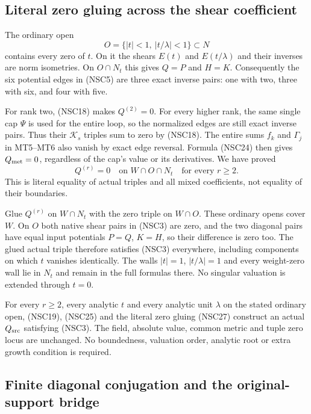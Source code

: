 \subsection{Literal zero gluing across the shear coefficient}

The ordinary open
\[
                 O=\{|t|<1,\ |t/\lambda|<1\}\subset N
 \tag{NSC26}
\]
contains every zero of $t$.  On it the shears $E(t)$
and $E(t/\lambda)$ and their inverses are norm
isometries.  On $O\cap N_t$ this gives
$Q=P$ and $H=K$.  Consequently the six potential
edges in (NSC5) are three exact inverse pairs:
one with two, three with six, and four with five.

For rank two, (NSC18) makes $Q^{(2)}=0$.
For every higher rank, the same single cap $\Psi$
is used for the entire loop, so the normalized edges
are still exact inverse pairs.  Thus their
$\mathcal K_s$ triples sum to zero by (NSC18).
The entire sums $f_k$ and $\Gamma_j$ in MT5--MT6
also vanish by exact edge reversal.  Formula (NSC24)
then gives $Q_{\rm met}=0$, regardless of the cap's
value or its derivatives.  We have proved
\[
                    Q^{(r)}=0
                         \quad\text{on }W\cap O\cap N_t
                                  \quad\text{for every }r\geq2.
 \tag{NSC27}
\]
This is literal equality of actual triples and all
mixed coefficients, not equality of their boundaries.

Glue $Q^{(r)}$ on $W\cap N_t$ with the zero triple
on $W\cap O$.  These ordinary opens cover $W$.
On $O$ both native shear pairs in (NSC3) are zero,
and the two diagonal pairs have equal input potentials
$P=Q$, $K=H$, so their difference is zero too.
The glued actual triple therefore satisfies (NSC3)
everywhere, including components on which $t$ vanishes
identically.  The walls $|t|=1$, $|t/\lambda|=1$ and
every weight-zero wall lie in $N_t$ and remain in
the full formulas there.  No singular valuation
is extended through $t=0$.

\begin{theorem}
For every $r\geq2$, every analytic $t$ and every
analytic unit $\lambda$ on the stated ordinary open,
(NSC19), (NSC25) and the literal zero gluing (NSC27)
construct an actual $Q_{\rm src}$ satisfying (NSC3).
The field, absolute value, common metric and tuple
zero locus are unchanged.  No boundedness, valuation
order, analytic root or extra growth condition is required.
\end{theorem}

\subsection{Finite diagonal conjugation and the original-support bridge}

